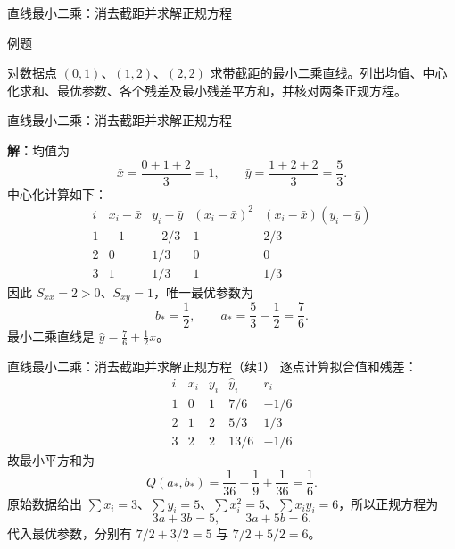 \documentclass[aspectratio=169,10pt,fontset=fandol]{ctexbeamer}
\begin{document}
\begin{frame}[t,fragile]{直线最小二乘：消去截距并求解正规方程}
\normalsize
\begin{block}{例题}
{\normalsize
对数据点 $(0,1)$、$(1,2)$、$(2,2)$ 求带截距的最小二乘直线。列出均值、中心化求和、最优参数、各个残差及最小残差平方和，并核对两条正规方程。

}
\end{block}
\end{frame}
\begin{frame}[t,fragile]{直线最小二乘：消去截距并求解正规方程}
\footnotesize
{\footnotesize
\par\noindent\textbf{解：}均值为
\[
\bar{x}=\frac{0+1+2}{3}=1,\qquad
\bar{y}=\frac{1+2+2}{3}=\frac53.
\]
中心化计算如下：
\[
\begin{array}{c|r|r|r|r}
i&x_i-\bar{x}&y_i-\bar{y}&(x_i-\bar{x})^2&(x_i-\bar{x})(y_i-\bar{y})\\ \hline
1&-1&-2/3&1&2/3\\
2&0&1/3&0&0\\
3&1&1/3&1&1/3
\end{array}
\]
因此 $S_{xx}=2>0$、$S_{xy}=1$，唯一最优参数为
\[
b_* =\frac12,\qquad a_* =\frac53-\frac12=\frac76.
\]
最小二乘直线是 $\hat{y}=\frac76+\frac12x$。
}
\end{frame}
\begin{frame}[t,fragile]{直线最小二乘：消去截距并求解正规方程（续1）}
\footnotesize
{\footnotesize
逐点计算拟合值和残差：
\[
\begin{array}{c|r|r|r|r}
i&x_i&y_i&\hat{y}_i&r_i\\ \hline
1&0&1&7/6&-1/6\\
2&1&2&5/3&1/3\\
3&2&2&13/6&-1/6
\end{array}
\]
故最小平方和为
\[
Q(a_*,b_*)=\frac1{36}+\frac19+\frac1{36}=\frac16.
\]
原始数据给出 $\sum x_i=3$、$\sum y_i=5$、$\sum x_i^2=5$、$\sum x_i y_i=6$，所以正规方程为
\[
3a+3b=5,\qquad 3a+5b=6.
\]
代入最优参数，分别有 $7/2+3/2=5$ 与 $7/2+5/2=6$。
}
\end{frame}
\end{document}
